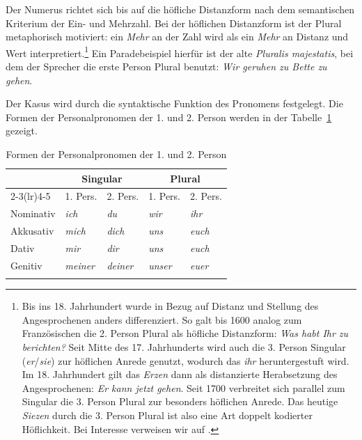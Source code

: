 Der Numerus richtet sich bis auf die höfliche Distanzform nach dem semantischen Kriterium der Ein- und Mehrzahl. Bei der höflichen Distanzform ist der Plural metaphorisch motiviert: ein \textit{Mehr} an der Zahl wird als ein \textit{Mehr} an Distanz und Wert interpretiert.\footnote{Bis ins 18. Jahrhundert wurde in Bezug auf Distanz und Stellung des Angesprochenen anders differenziert. So galt bis 1600 analog zum Französischen die 2. Person Plural als höfliche Distanzform: \textit{Was habt Ihr zu berichten?} Seit Mitte des 17. Jahrhunderts wird auch die 3. Person Singular (\textit{er}/\textit{sie}) zur höflichen Anrede genutzt, wodurch das \textit{ihr} heruntergestuft wird. Im 18. Jahrhundert gilt das \textit{Erzen} dann als distanzierte Herabsetzung des Angesprochenen: \textit{Er kann jetzt gehen}. Seit 1700 verbreitet sich parallel zum Singular die 3. Person Plural zur besonders höflichen Anrede. Das heutige \textit{Siezen} durch die 3. Person Plural ist also eine Art doppelt kodierter Höflichkeit. Bei Interesse verweisen wir auf \citet[123--137]{Glueck2013}.} Ein Paradebeispiel hierfür ist der alte \textit{Pluralis majestatis}, bei dem der Sprecher die erste Person Plural benutzt: \textit{Wir geruhen zu Bette zu gehen}.

Der Kasus wird durch die syntaktische Funktion des Pronomens festgelegt. Die Formen der Personalpronomen der 1. und 2. Person werden in der Tabelle~\ref{tab:Pers_Prn_1_2} gezeigt.

\begin{table}
  \centering
  \begin{tabular}{l l l l l}
    \lsptoprule
     & \multicolumn{2}{c}{Singular} & \multicolumn{2}{c}{Plural} \\
     \cmidrule(lr){2-3}\cmidrule(lr){4-5}
     & 1. Pers. & 2. Pers. & 1. Pers. & 2. Pers.\\   
    \hline
    Nominativ & \textit{ich} & \textit{du} & \textit{wir} &\textit{ihr} \\
   
    Akkusativ & \textit{mich} & \textit{dich} & \textit{uns} &\textit{euch} \\
    
    Dativ & \textit{mir} & \textit{dir} & \textit{uns} &\textit{euch}  \\
    
    Genitiv & \textit{meiner} & \textit{deiner} & \textit{unser} &\textit{euer}  \\
    \lspbottomrule 
  \end{tabular}
  \caption{Formen der Personalpronomen der 1. und 2. Person}
  \label{tab:Pers_Prn_1_2}
\end{table}

